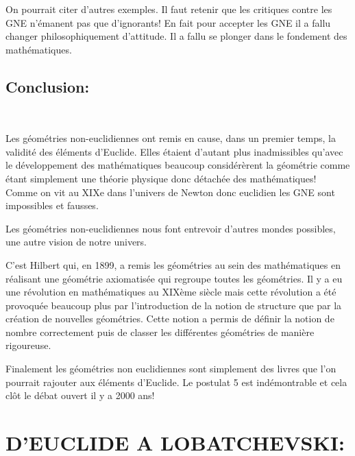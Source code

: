 \documentclass[a4paper, 12pt, twoside]{book}
\begin{document}
 On pourrait citer d'autres exemples. Il faut retenir que les critiques contre les GNE n'émanent pas que d'ignorants! En fait pour accepter les GNE il a fallu changer philosophiquement d'attitude. Il a fallu se plonger dans le fondement des mathématiques. \medskip 
  
   \chapter{Conclusion:}\
   
   
     Les géométries non-euclidiennes ont remis en cause, dans un premier temps, la validité des éléments d’Euclide. Elles étaient d'autant plus inadmissibles qu'avec le développement des mathématiques beaucoup considérèrent la géométrie comme étant simplement une théorie physique donc détachée des mathématiques! Comme on vit au XIXe dans l'univers de Newton donc euclidien les GNE sont impossibles et fausses. \medskip 
      
     Les géométries non-euclidiennes nous font entrevoir d'autres mondes possibles, une autre vision de notre univers.\medskip 
     
  C’est Hilbert qui, en 1899, a remis les géométries au sein des mathématiques en réalisant une géométrie axiomatisée qui regroupe toutes les géométries.
 Il y a eu une révolution en mathématiques au XIXème siècle mais cette révolution a été provoquée beaucoup plus par l’introduction de la notion de structure que par la création de nouvelles géométries. Cette notion a permis de définir la notion de nombre correctement puis de classer les différentes géométries de manière rigoureuse.\medskip 
 

 Finalement les géométries non euclidiennes sont simplement des livres que l'on pourrait rajouter aux éléments d'Euclide. Le postulat 5 est indémontrable et cela clôt le débat ouvert il y a 2000 ans! 
 
              


  
 
 
  
  
    
 








\part{D'EUCLIDE A LOBATCHEVSKI:}
\end{document}
